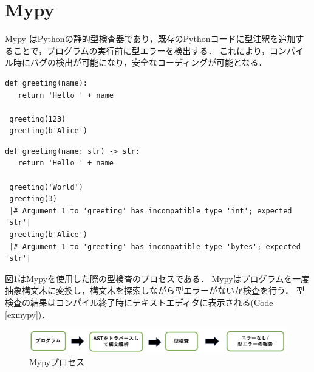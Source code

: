 \documentclass{thesis}
\begin{document}
\newpage
\section{Mypy}
Mypy \cite{Mypy}はPythonの静的型検査器であり，既存のPythonコードに型注釈を追加することで，プログラムの実行前に型エラーを検出する．
これにより，コンパイル時にバグの検出が可能になり，安全なコーディングが可能となる．
\begin{lstlisting}[caption=型注釈のないPythonコード,numbers=none]
 def greeting(name):
   return 'Hello ' + name
 
 greeting(123)
 greeting(b'Alice')
\end{lstlisting}
\begin{lstlisting}[caption=型注釈のあるPythonコード,label=exmypy,numbers=none]
 def greeting(name: str) -> str:
   return 'Hello ' + name
 
 greeting('World') 
 greeting(3)         
 |# Argument 1 to 'greeting' has incompatible type 'int'; expected 'str'|
 greeting(b'Alice')  
 |# Argument 1 to 'greeting' has incompatible type 'bytes'; expected 'str'|
\end{lstlisting}
図\ref{mypyproc}はMypyを使用した際の型検査のプロセスである．
Mypyはプログラムを一度抽象構文木に変換し，構文木を探索しながら型エラーがないか検査を行う．
型検査の結果はコンパイル終了時にテキストエディタに表示される(Code \ref{exmypy})．
\begin{figure}[H]
  \centering
  \includegraphics[scale=0.6]{image/mypyprocess.png}
  \caption{Mypyプロセス}
  \label{mypyproc}
\end{figure}
\end{document}
